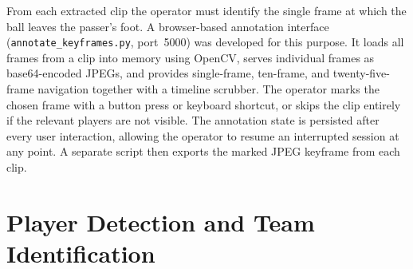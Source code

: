 From each extracted clip the operator must identify the single frame at which the ball leaves the passer's foot. A browser-based annotation interface (\texttt{annotate\_keyframes.py}, port~5000) was developed for this purpose. It loads all frames from a clip into memory using OpenCV, serves individual frames as base64-encoded JPEGs, and provides single-frame, ten-frame, and twenty-five-frame navigation together with a timeline scrubber. The operator marks the chosen frame with a button press or keyboard shortcut, or skips the clip entirely if the relevant players are not visible. The annotation state is persisted after every user interaction, allowing the operator to resume an interrupted session at any point. A separate script then exports the marked JPEG keyframe from each clip.

\section{Player Detection and Team Identification}%
\label{sec:impl_team_id}

